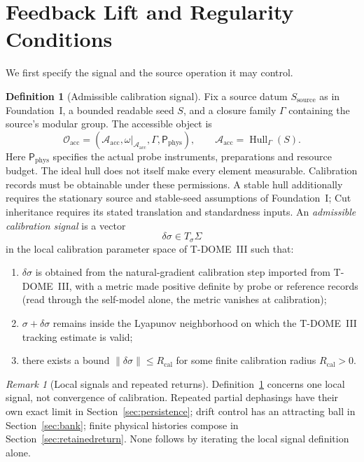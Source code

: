 \documentclass[12pt]{article}
\theoremstyle{definition}
\newtheorem{definition}[theorem]{Definition}
\theoremstyle{remark}
\newtheorem{remark}[theorem]{Remark}
\begin{document}
\section{Feedback Lift and Regularity Conditions}\label{sec:feedback}

We first specify the signal and the source operation it may control.

\begin{definition}[Admissible calibration signal]\label{def:signal}
Fix a source datum \(S_{\mathrm{source}}\) as in Foundation~I,
a bounded readable seed \(S\), and a closure family \(\Gamma\) containing
the source's modular group. The accessible object is
\[
\mathcal O_{\mathrm{acc}}
= (\mathcal A_{\mathrm{acc}},\omega|_{\mathcal A_{\mathrm{acc}}},
       \Gamma,\mathsf P_{\mathrm{phys}}),\qquad
\mathcal A_{\mathrm{acc}}=\operatorname{Hull}_{\Gamma}(S).
\]
Here \(\mathsf P_{\mathrm{phys}}\) specifies the actual probe instruments,
preparations and resource budget. The ideal hull does not itself make
every element measurable. Calibration records must be obtainable under
these permissions. A stable hull additionally requires the stationary
source and stable-seed assumptions of Foundation~I; Cut inheritance
requires its stated translation and standardness inputs.
An \emph{admissible calibration signal} is a vector
\[
\delta\sigma \in T_\sigma\Sigma
\]
in the local calibration parameter space of T-DOME~III such that:
\begin{enumerate}
\item \(\delta\sigma\) is obtained from the natural-gradient calibration
  step imported from T-DOME~III, with a metric made positive definite by
  probe or reference records (read through the self-model alone, the
  metric vanishes at calibration);
\item \(\sigma+\delta\sigma\) remains inside the Lyapunov neighborhood on
  which the T-DOME~III tracking estimate is valid;
\item there exists a bound
  \(\|\delta\sigma\| \leq R_{\mathrm{cal}}\) for some finite
  calibration radius \(R_{\mathrm{cal}}>0\).
\end{enumerate}
\end{definition}

\begin{remark}[Local signals and repeated returns]
Definition~\ref{def:signal} concerns one local signal, not convergence
of calibration. Repeated partial dephasings have their own exact
limit in Section~\ref{sec:persistence}; drift control has an attracting
ball in Section~\ref{sec:bank}; finite physical histories compose in
Section~\ref{sec:retainedreturn}. None follows by iterating the local
signal definition alone.
\end{remark}
\end{document}
